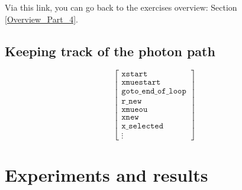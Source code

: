 \documentclass[../main/main.tex]{subfiles}
\begin{document}
\vspace{0.7cm}
Via this link, you can go back to the exercises overview: Section \underline{\ref{Overview_Part_4}}.

\subsection{Keeping track of the photon path}
\begin{equation}
\left[
\begin{matrix}
\texttt{xstart} \\
\texttt{xmuestart} \\
\texttt{goto\_end\_of\_loop} \\ 
\hline
\texttt{r\_new} \\
\texttt{xmueou} \\
\texttt{xnew} \\
\texttt{x\_selected} \\ 
\hline
\vdots 
\end{matrix}
\right]
\end{equation}


\newpage
\section{Experiments and results}
\label{Dual_line_experiments_results}
\end{document}
